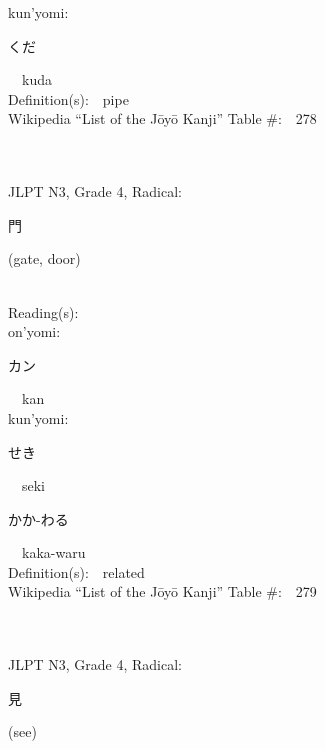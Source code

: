 \begin{multicols}{2}
{\hspace*{1em}}kun'yomi:\ \ \\
{\hspace*{2em}}{\begin{CJK}{UTF8}{min} くだ \end{CJK}}\ \ kuda\ \ \\
Definition(s):\ \ pipe \\
Wikipedia ``List of the J\=oy\=o Kanji'' Table \#:\ \ 278 \\
\ \ \\
{\fontsize{34pt}{40pt}  }\ \ \\  %
{JLPT N3, Grade 4, Radical:\ \ {\begin{CJK}{UTF8}{min} 門 \end{CJK}} (gate, door) } \\
Reading(s):\ \ \\
{\hspace*{1em}}on'yomi:\ \ \\
{\hspace*{2em}}{\begin{CJK}{UTF8}{min} カン \end{CJK}}\ \ kan\ \ \\
{\hspace*{1em}}kun'yomi:\ \ \\
{\hspace*{2em}}{\begin{CJK}{UTF8}{min} せき \end{CJK}}\ \ seki\ \ \\
{\hspace*{2em}}{\begin{CJK}{UTF8}{min} かか-わる \end{CJK}}\ \ kaka-waru\ \ \\
Definition(s):\ \ related \\
Wikipedia ``List of the J\=oy\=o Kanji'' Table \#:\ \ 279 \\
\ \ \\
{\fontsize{34pt}{40pt}  }\ \ \\  %
{JLPT N3, Grade 4, Radical:\ \ {\begin{CJK}{UTF8}{min} 見 \end{CJK}} (see) } \\

\end{multicols}
